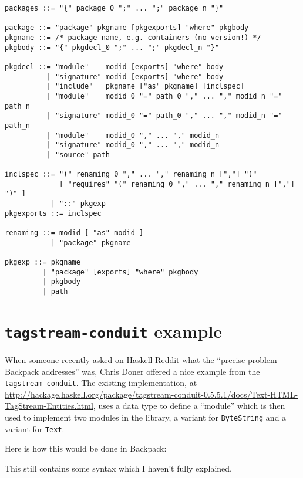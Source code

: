\documentclass{article}
\newcommand{\Red}[1]{{\color{red} #1}}
\begin{document}
\begin{verbatim}
packages ::= "{" package_0 ";" ... ";" package_n "}"

package ::= "package" pkgname [pkgexports] "where" pkgbody
pkgname ::= /* package name, e.g. containers (no version!) */
pkgbody ::= "{" pkgdecl_0 ";" ... ";" pkgdecl_n "}"

pkgdecl ::= "module"    modid [exports] "where" body
          | "signature" modid [exports] "where" body
          | "include"   pkgname ["as" pkgname] [inclspec]
          | "module"    modid_0 "=" path_0 "," ... "," modid_n "=" path_n
          | "signature" modid_0 "=" path_0 "," ... "," modid_n "=" path_n
          | "module"    modid_0 "," ... "," modid_n
          | "signature" modid_0 "," ... "," modid_n
          | "source" path

inclspec ::= "(" renaming_0 "," ... "," renaming_n [","] ")"
             [ "requires" "(" renaming_0 "," ... "," renaming_n [","] ")" ]
           | "::" pkgexp
pkgexports ::= inclspec

renaming ::= modid [ "as" modid ]
           | "package" pkgname

pkgexp ::= pkgname
         | "package" [exports] "where" pkgbody
         | pkgbody
         | path
\end{verbatim}

\newpage
\label{sec:tagstream-example}
\section{\texttt{tagstream-conduit} example}

When someone recently asked on Haskell Reddit what the ``precise problem Backpack
addresses'' was, Chris Doner offered a nice example from the
\verb|tagstream-conduit|.  The existing implementation, at \url{http://hackage.haskell.org/package/tagstream-conduit-0.5.5.1/docs/Text-HTML-TagStream-Entities.html}, uses a data type
to define a ``module'' which is then used to implement two modules in the
library, a variant for \verb|ByteString| and a variant for \verb|Text|.

Here is how this would be done in Backpack:

\Red{This still contains some syntax which I haven't fully explained.}
\end{document}
